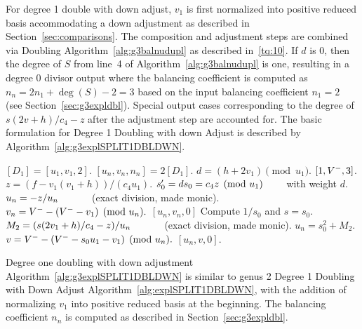 For degree 1 double with down adjust, $v_1$ is
first normalized into positive reduced basis accommodating a down adjustment as
described in Section~\ref{sec:comparisons}. The composition and adjustment steps
are combined via Doubling Algorithm~\ref{alg:g3balnudupl} as described
in~\ref{tq:10}. If $d$ is 0, then the degree of $S$ from line~4 of
Algorithm~\ref{alg:g3balnudupl} is one, resulting in a degree 0 divisor output
where the balancing coefficient is computed as $n_n = 2n_1 + \deg(S) - 2 = 3$ based
on the input balancing coefficient $n_1 = 2$ (see Section~\ref{sec:g3expldbl}).
Special output cases corresponding to the degree of $s(2v + h)/c_4 - z$ after
the adjustment step are accounted for. The basic formulation for Degree 1
Doubling with down Adjust is described by
Algorithm~\ref{alg:g3explSPLIT1DBLDWN}. 
\begin{algorithm}[htbp]
\caption{Genus 3 Split Model Degree 1 Doubling with Down Adjust \label{alg:g3explSPLIT1DBLDWN}}
\begin{algorithmic} [1]
\Require $[D_1] = [u_1,v_1,2]$.  \smallskip
\Ensure $[u_n,v_n,n_n] = 2[D_1]$.
\algrule
\State
\State $d = (h + 2v_1) \pmod{u_1}$.
 \Return $[1,V^{-},3]$.
\EndIf
\State $z = (f - v_1(v_1 + h))/(c_4u_1)$.
\State $s_0' = ds_0 = c_4z \pmod{u_1} \quad\quad$ with weight $d$.
    \State $u_n = -z/u_n \quad\quad\quad$ (exact division, made monic).
    \State $v_n = V^{-} - (V^{-} - v_1)  \pmod{u_n}.$
    \State \Return $[u_n,v_n,0]$
\EndIf
\State Compute $1/s_0$ and $s = s_0$.
\State $M_2 = (s(2v_1 + h)/c_4 - z)/u_n \quad\quad\quad $ (exact division, made monic).
\State $u_n = s_0^2 + M_2$.
\State $v = V^{-} - (V^{-} - s_0u_1 - v_1)  \pmod{u_n}.$
\State \Return $[u_n,v,0]$.
\end{algorithmic}
\end{algorithm}
Degree one doubling with down adjustment Algorithm~\ref{alg:g3explSPLIT1DBLDWN}
is similar to genus 2 Degree 1 Doubling with Down Adjust
Algorithm~\ref{alg:explSPLIT1DBLDWN}, with the addition of normalizing $v_1$
into positive reduced basis at the beginning. The balancing coefficient $n_n$ is
computed as described in Section~\ref{sec:g3expldbl}.

